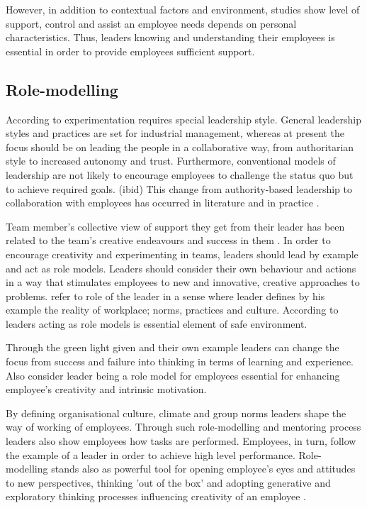 However, in addition to contextual factors and environment, studies show level of support, control and assist an employee needs depends on personal characteristics. Thus, leaders knowing and understanding their employees is essential in order to provide employees sufficient support. \citep{shalley2004leaders}

\subsection{Role-modelling}
According to \citet{mumford2002leading} experimentation requires special leadership style. General leadership styles and practices are set for industrial management, whereas at present the focus should be on leading the people in a collaborative way, from authoritarian style to increased autonomy and trust. Furthermore, conventional models of leadership are not likely to encourage employees to challenge the status quo but to achieve required goals. (ibid) This change from authority-based leadership to collaboration with employees has occurred in literature and in practice \citep{amabile2008creativity,farson2002failuretolerantleader}. 

Team member's collective view of support they get from their leader has been related to the team's creative endeavours and success in them \citep{amabile1998kill,amabile1996assessing}. In order to encourage creativity and experimenting in teams, leaders should lead by example and act as role models. Leaders should consider their own behaviour and actions in a way that stimulates employees to new and innovative, creative approaches to problems. \citep{mumford2002leading,amabile2008creativity,waldman1990adding} \citet{katz1978social} refer to role of the leader in a sense where leader defines by his example the reality of workplace; norms, practices and culture. According to \citet{mumford2002leading} leaders acting as role models is essential element of safe environment.  

Through the green light given and their own example leaders can change the focus from success and failure into thinking in terms of learning and experience. \citep{farson2002failuretolerantleader} Also \citet{amabile2004leader} consider leader being a role model for employees essential for enhancing employee's creativity and intrinsic motivation. 

By defining organisational culture, climate and group norms leaders shape the way of working of employees. Through such role-modelling and mentoring process leaders also show employees how tasks are performed. Employees, in turn, follow the example of a leader in order to achieve high level performance. \citep{redmond1993putting} Role-modelling stands also as powerful tool for opening employee's eyes and attitudes to new perspectives, thinking 'out of the box' and adopting generative and exploratory thinking processes \citep{jung2003role,sternberg1997creativity} influencing creativity of an employee \citep{shalley2004leaders}. 

